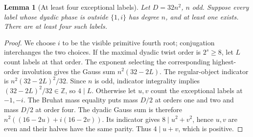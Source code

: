\documentclass[11pt,a4paper]{article}
\numberwithin{equation}{section}
\newtheorem{lemma}[theorem]{Lemma}
\begin{document}
\begin{lemma}[At least four exceptional labels]
\label{red:ef:dyadic-mass}
Let $D=32n^2$, $n$ odd. Suppose every label whose dyadic phase
is outside $\{1,i\}$ has degree $n$, and at least one exists.
There are at least four such labels.
\end{lemma}
\begin{proof}
We choose $i$ to be the visible primitive fourth root; conjugation
interchanges the two choices. If the maximal dyadic twist order is $2^s\ge8$, let $L$ count
labels at that order. The exponent selecting the corresponding
highest-order involution gives the Gauss sum $n^2(32-2L)$.
The regular-object indicator is $n^2(32-2L)^2/32$.
Since $n$ is odd, indicator integrality implies
$(32-2L)^2/32\in\mathbb Z$, so $4\mid L$.
Otherwise let $u,v$ count the exceptional labels at $-1,-i$.
The Bruhat mass equality puts mass $D/2$ at orders one and two
and mass $D/2$ at order four. The dyadic Gauss sum is therefore
$n^2((16-2u)+i(16-2v))$. Its indicator gives
$8\mid u^2+v^2$, hence $u,v$ are even and their halves have
the same parity. Thus $4\mid u+v$, which is positive.
\end{proof}
\end{document}
